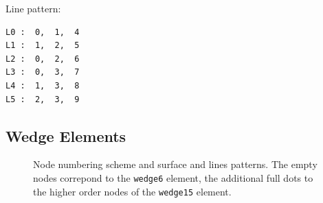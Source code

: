 Line pattern:
\begin{verbatim}
L0 :  0,  1,  4
L1 :  1,  2,  5
L2 :  0,  2,  6
L3 :  0,  3,  7
L4 :  1,  3,  8
L5 :  2,  3,  9
\end{verbatim}

\newpage
\subsection{Wedge Elements}

\begin{figure}[h!]
\begin{center}
\caption{Node numbering scheme and surface and lines patterns. The empty nodes correpond to the \texttt{wedge6} element, the additional full dots to the higher order nodes of the \texttt{wedge15} element.}
\label{fig:conventions:wedge}
\end{center}
\end{figure}



